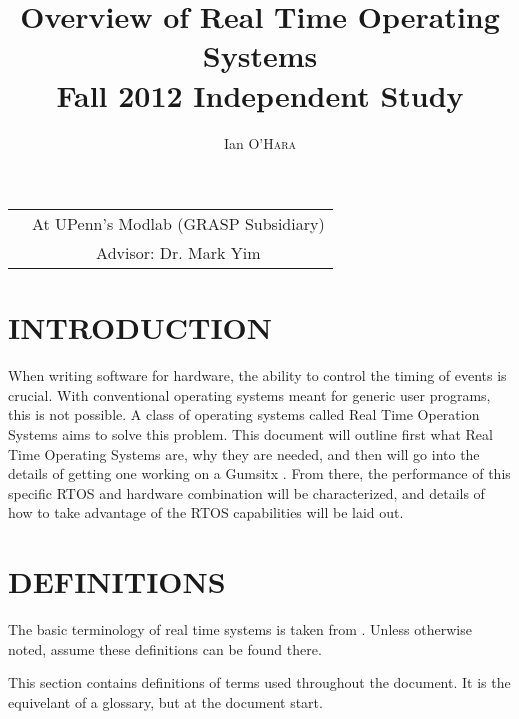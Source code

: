 \documentclass{article}
\title{Overview of Real Time Operating Systems \\ Fall 2012 Independent Study} %
\author{Ian \textsc{O'Hara}} %
\begin{document}
\maketitle %
\begin{tabular}{lc}
    \date & At UPenn's Modlab (GRASP Subsidiary)\\ %
    &Advisor: Dr. Mark Yim %
\end{tabular}
\setlength\parindent{0pt} %
\renewcommand{\labelenumi}{\alph{enumi}.} %

\section{INTRODUCTION}
When writing software for hardware, the ability to control the timing of events is crucial.  With conventional operating systems meant for generic user programs, this is not possible.  A class of operating systems called Real Time Operation Systems aims to solve this problem.  This document will outline first what Real Time Operating Systems are, why they are needed, and then will go into the details of getting one working on a Gumsitx \cite{gumstix}.  From there, the performance of this specific RTOS and hardware combination will be characterized, and details of how to take advantage of the RTOS capabilities will be laid out.

\section{DEFINITIONS}
The basic terminology of real time systems is taken from \cite{Laplante}.  Unless otherwise noted, assume these definitions can be found there.

This section contains definitions of terms used throughout the document.  It is the equivelant of a glossary, but at the document start.
\end{document}
